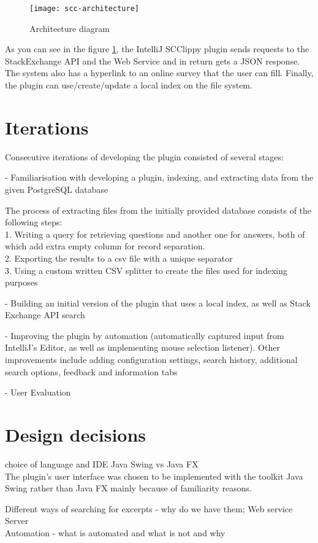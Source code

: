 \documentclass{l4proj}
\begin{document}
\begin{figure}[h]
\caption{Architecture diagram}
\texttt{[image: scc-architecture]}
\centering
\label{fig:architecture}
\end{figure}
As you can see in the figure \ref{fig:architecture}, the 
IntelliJ SCClippy plugin sends requests to the StackExchange API and the Web Service and in return gets a JSON response. The system also has a hyperlink to an online survey that the user can fill. Finally, the plugin can use/create/update a local index on the file system.

\section{Iterations}
Consecutive iterations of developing the plugin consisted of several stages:

- Familiarisation with developing a plugin, indexing, and extracting data from the given PostgreSQL database

The process of extracting files from the initially provided database consists of the following steps:\\
1. Writing a query for retrieving questions and another one for answers, both of which add extra empty column for record separation.\\
2. Exporting the results to a csv file with a unique separator\\
3. Using a custom written CSV splitter to create the files used for indexing purposes

- Building an initial version of the plugin that uses a local index, as well as Stack Exchange API search

- Improving the plugin by automation (automatically captured input from IntelliJ's Editor, as well as implementing mouse selection listener). Other improvements include adding configuration settings, search history, additional search options, feedback and information tabs

- User Evaluation

\section{Design decisions}
choice of language and IDE
Java Swing vs Java FX\\
The plugin's user interface was chosen to be implemented with the toolkit Java Swing rather than Java FX mainly because of familiarity reasons.

Different ways of searching for excerpts - why do we have them; Web service Server\\
Automation - what is automated and what is not and why\\
\end{document}
